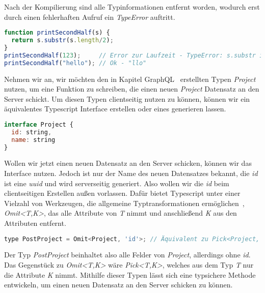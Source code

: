 Nach der Kompilierung sind alle Typinformationen entfernt worden, wodurch erst durch einen fehlerhaften Aufruf
ein \emph{TypeError} auftritt.

\begin{lstlisting}[language=Javascript,float=h!,caption={Zu Javascript kompilierte Funktion}, label={fig:basics:typescript:2}]
function printSecondHalf(s) {
  return s.substr(s.length/2);
}
printSecondHalf(123);     // Error zur Laufzeit - TypeError: s.substr is not a function
printSecondHalf("hello"); // Ok - "llo"
\end{lstlisting}

Nehmen wir an, wir möchten den in Kapitel GraphQL~ erstellten Typen \emph{Project} nutzen,
um eine Funktion zu schreiben, die einen neuen \emph{Project} Datensatz an den Server schickt. Um diesen Typen clientseitig nutzen zu können,
können wir ein äquivalentes Typescript Interface erstellen oder eines generieren lassen.

\begin{lstlisting}[language=Javascript,float=h!,caption={Typescript Project Interface}, label={fig:basics:typescript:3}]
interface Project {
  id: string,
  name: string
}
\end{lstlisting}

Wollen wir jetzt einen neuen Datensatz an den Server schicken, können wir das Interface nutzen. Jedoch ist nur der Name des neuen Datensatzes bekannt,
die \emph{id} ist eine \emph{uuid} und wird serverseitig generiert. Also wollen wir die \emph{id} beim clientseitigen Erstellen außen vorlassen.
Dafür bietet Typescript unter einer Vielzahl von Werkzeugen, die allgemeine Typtransformationen ermöglichen~\cite{typescript-utility-types},
\emph{Omit<T,K>}, das alle Attribute von \emph{T} nimmt und anschließend \emph{K} aus den Attributen entfernt.

\begin{lstlisting}[language=Javascript,float=h!,caption={Transformierter \emph{Project} Typ}, label={fig:basics:typescript:4}]
type PostProject = Omit<Project, 'id'>; // Äquivalent zu Pick<Project, 'name'>
\end{lstlisting}

Der Typ \emph{PostProject} beinhaltet also alle Felder von \emph{Project}, allerdings ohne \emph{id}. Das Gegenstück zu \emph{Omit<T,K>} wäre \emph{Pick<T,K>},
welches aus dem Typ \emph{T} nur die Attribute \emph{K} nimmt. Mithilfe dieser Typen lässt sich eine typsichere Methode entwickeln,
um einen neuen Datensatz an den Server schicken zu können.

